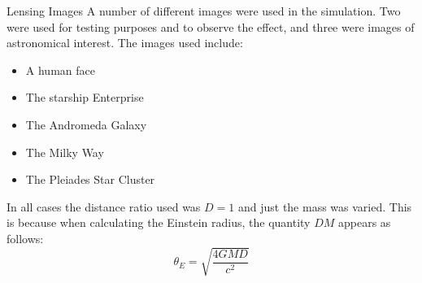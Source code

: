 \documentclass[aspectratio=1610,xcolor=dvipsnames,t]{beamer}
\begin{document}
\begin{frame}{Lensing Images}
    A number of different images were used in the simulation. Two were used
    for testing purposes and to observe the effect, and three were images
    of astronomical interest. The images used include:
    \begin{itemize}
        \item A human face
        \item The starship Enterprise
        \item The Andromeda Galaxy
        \item The Milky Way
        \item The Pleiades Star Cluster
    \end{itemize}


    In all cases the distance ratio used was $D = 1$ and just the mass
    was varied. This is because when calculating the Einstein radius,
    the quantity $DM$ appears as follows:
    \begin{equation}
        \theta_E = \sqrt{\frac{4GMD}{c^2}}
    \end{equation}
\end{frame} 


\end{document}
